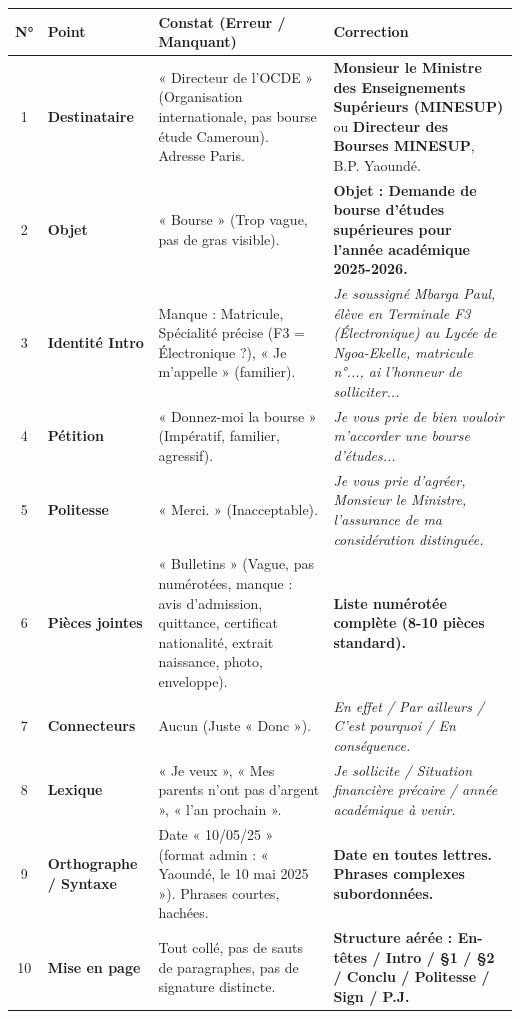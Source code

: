 \documentclass[11pt]{article}
\begin{document}
\begin{exoresolu}
\begin{center}
\begin{tabular}{|c|l|l|l|}
\hline
\textbf{N°} & \textbf{Point} & \textbf{Constat (Erreur / Manquant)} & \textbf{Correction} \\
\hline
1 & \textbf{Destinataire} & « Directeur de l'OCDE » (Organisation internationale, pas bourse étude Cameroun). Adresse Paris. & \textbf{Monsieur le Ministre des Enseignements Supérieurs (MINESUP)} ou \textbf{Directeur des Bourses MINESUP}, B.P. Yaoundé. \\
2 & \textbf{Objet} & « Bourse » (Trop vague, pas de gras visible). & \textbf{Objet : Demande de bourse d'études supérieures pour l'année académique 2025-2026.} \\
3 & \textbf{Identité Intro} & Manque : Matricule, Spécialité précise (F3 = Électronique ?), « Je m'appelle » (familier). & \emph{Je soussigné Mbarga Paul, élève en Terminale F3 (Électronique) au Lycée de Ngoa-Ekelle, matricule n°..., ai l'honneur de solliciter...} \\
4 & \textbf{Pétition} & « Donnez-moi la bourse » (Impératif, familier, agressif). & \emph{Je vous prie de bien vouloir m'accorder une bourse d'études...} \\
5 & \textbf{Politesse} & « Merci. » (Inacceptable). & \emph{Je vous prie d'agréer, Monsieur le Ministre, l'assurance de ma considération distinguée.} \\
6 & \textbf{Pièces jointes} & « Bulletins » (Vague, pas numérotées, manque : avis d'admission, quittance, certificat nationalité, extrait naissance, photo, enveloppe). & \textbf{Liste numérotée complète (8-10 pièces standard).} \\
7 & \textbf{Connecteurs} & Aucun (Juste « Donc »). & \emph{En effet / Par ailleurs / C'est pourquoi / En conséquence.} \\
8 & \textbf{Lexique} & « Je veux », « Mes parents n'ont pas d'argent », « l'an prochain ». & \emph{Je sollicite / Situation financière précaire / année académique à venir.} \\
9 & \textbf{Orthographe / Syntaxe} & Date « 10/05/25 » (format admin : « Yaoundé, le 10 mai 2025 »). Phrases courtes, hachées. & \textbf{Date en toutes lettres. Phrases complexes subordonnées.} \\
10 & \textbf{Mise en page} & Tout collé, pas de sauts de paragraphes, pas de signature distincte. & \textbf{Structure aérée : En-têtes / Intro / §1 / §2 / Conclu / Politesse / Sign / P.J.} \\
\hline
\end{tabular}
\end{center}


\end{exoresolu}
\end{document}
